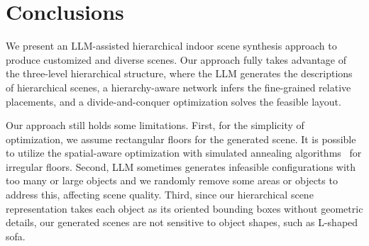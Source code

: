 \section{Conclusions}

We present an LLM-assisted hierarchical indoor scene synthesis approach to produce customized and diverse scenes. Our approach fully takes advantage of the three-level hierarchical structure, where the LLM generates the descriptions of hierarchical scenes, a hierarchy-aware network infers the fine-grained relative placements, and a divide-and-conquer optimization solves the feasible layout.

Our approach still holds some limitations. First, for the simplicity of optimization, we assume rectangular floors for the generated scene. It is possible to utilize the spatial-aware optimization with simulated annealing algorithms~\cite{Yu2011MakeIH} for irregular floors. Second, LLM sometimes generates infeasible configurations with too many or large objects and we randomly remove some areas or objects to address this, affecting scene quality. Third, since our hierarchical scene representation takes each object as its oriented bounding boxes without geometric details, our generated scenes are not sensitive to object shapes, such as L-shaped sofa. 